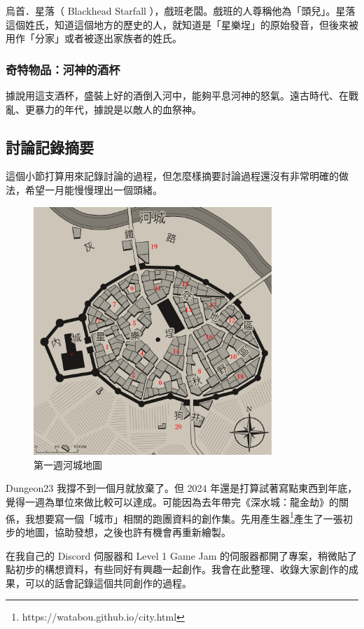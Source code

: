 \documentclass[10pt, a5paper]{article}
\begin{document}
\begin{CJK}{UTF8}{bsmi}
烏首．星落（ Blackhead Starfall ），戲班老闆。戲班的人尊稱他為「頭兒」。星落這個姓氏，知道這個地方的歷史的人，就知道是「星樂埕」的原始發音，但後來被用作「分家」或者被逐出家族者的姓氏。

\subsubsection{奇特物品：河神的酒杯}

據說用這支酒杯，盛裝上好的酒倒入河中，能夠平息河神的怒氣。遠古時代、在戰亂、更暴力的年代，據說是以敵人的血祭神。

\vfill
\pagebreak

\subsection{討論記錄摘要}

這個小節打算用來記錄討論的過程，但怎麼樣摘要討論過程還沒有非常明確的做法，希望一月能慢慢理出一個頭緒。

\begin{figure}[h]
    \centering
    \includegraphics[width=9cm, keepaspectratio]{imgs/RiverCity_v01.jpg}
    \caption{第一週河城地圖}
    \label{fig:2024W01}
\end{figure}

Dungeon23 我撐不到一個月就放棄了。但 2024 年還是打算試著寫點東西到年底，覺得一週為單位來做比較可以達成。可能因為去年帶完《深水城：龍金劫》的關係，我想要寫一個「城市」相關的跑團資料的創作集。先用產生器\footnote{https://watabou.github.io/city.html }產生了一張初步的地圖，協助發想，之後也許有機會再重新繪製。

在我自己的 Discord 伺服器和 Level 1 Game Jam 的伺服器都開了專案，稍微貼了點初步的構想資料，有些同好有興趣一起創作。我會在此整理、收錄大家創作的成果，可以的話會記錄這個共同創作的過程。



\end{CJK}
\end{document}

